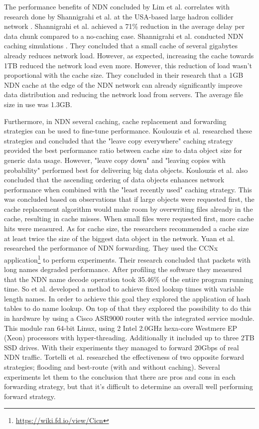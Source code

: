 The performance benefits of NDN concluded by Lim et al. correlates with research done by Shannigrahi et al. at the USA-based large hadron collider network \cite{shannigrahi2015named}. Shannigrahi et al. achieved a 71\% reduction in the average delay per data chunk compared to a no-caching case. Shannigrahi et al. conducted NDN caching simulations \cite{shannigrahi2017request}. They concluded that a small cache of several gigabytes already reduces network load. However, as expected, increasing the cache towards 1TB reduced the network load even more. However, this reduction of load wasn't proportional with the cache size. They concluded in their research that a 1GB NDN cache at the edge of the NDN network can already significantly improve data distribution and reducing the network load from servers. The average file size in use was 1.3GB.

Furthermore, in NDN several caching, cache replacement and forwarding strategies can be used to fine-tune performance. Koulouzis et al. researched these strategies and concluded that the "leave copy everywhere" caching strategy provided the best performance ratio between cache size to data object size for generic data usage. However, "leave copy down" and "leaving copies with probability" performed best for delivering big data objects. Koulouzis et al. also concluded that the ascending ordering of data objects enhances network performance when combined with the "least recently used" caching strategy. This was concluded based on observations that if large objects were requested first, the cache replacement algorithm would make room by overwriting files already in the cache, resulting in cache misses. When small files were requested first, more cache hits were measured. As for cache size, the researchers recommended a cache size at least twice the size of the biggest data object in the network. Yuan et al. \cite{yuan2012scalable} researched the performance of NDN forwarding. They used the CCNx application\footnote{\url{https://wiki.fd.io/view/Cicn}} to perform experiments. Their research concluded that packets with long names degraded performance. After profiling the software they measured that the NDN name decode operation took 35.46\% of the entire program running time. So et al. \cite{so2013named} developed a method to achieve fixed lookup times with variable length names. In order to achieve this goal they explored the application of hash tables to do name lookup. On top of that they explored the possibility to do this in hardware by using a Cisco ASR9000 router with the integrated service module. This module ran 64-bit Linux, using 2 Intel 2.0GHz hexa-core Westmere EP (Xeon) processors with hyper-threading. Additionally it included up to three 2TB SSD drives. With their experiments they managed to forward 20Gbps of real NDN traffic. Tortelli et al. \cite{tortelli2013performance} researched the effectiveness of two opposite forward strategies; flooding and best-route (with and without caching). Several experiments let them to the conclusion that there are pros and cons in each forwarding strategy, but that it's difficult to determine an overall well performing forward strategy.

